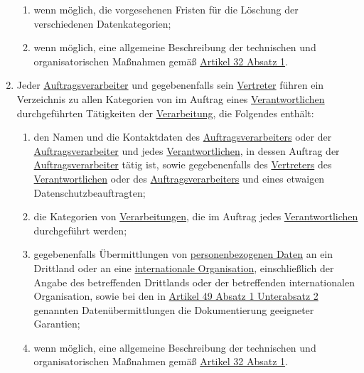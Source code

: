\begin{enumerate}
\begin{enumerate}
    \item wenn möglich, die vorgesehenen Fristen für die Löschung der verschiedenen Datenkategorien;
    \label{itm:30-1f}

    \item wenn möglich, eine allgemeine Beschreibung der technischen und organisatorischen Maßnahmen gemäß
     \hyperref[itm:32-1]{Artikel 32 Absatz 1}.
    \label{itm:30-1g}

  \end{enumerate}

  \item Jeder \hyperref[itm:04-8]{Auftragsverarbeiter} und gegebenenfalls sein \hyperref[itm:04-17]{Vertreter} führen
   ein Verzeichnis zu allen Kategorien von im Auftrag eines \hyperref[itm:04-7]{Verantwortlichen} durchgeführten
   Tätigkeiten der \hyperref[itm:04-2]{Verarbeitung}, die Folgendes enthält:
  \label{itm:30-2}

  \begin{enumerate}
  
    \item den Namen und die Kontaktdaten des \hyperref[itm:04-8]{Auftragsverarbeiters} oder der \hyperref[itm:04-8]
     {Auftragsverarbeiter} und jedes
     \hyperref[itm:04-7]{Verantwortlichen}, in dessen Auftrag der \hyperref[itm:04-8]{Auftragsverarbeiter} tätig ist,
      sowie gegebenenfalls des \hyperref[itm:04-17]{Vertreters} des
     \hyperref[itm:04-7]{Verantwortlichen} oder des \hyperref[itm:04-8]{Auftragsverarbeiters} und eines etwaigen
      Datenschutzbeauftragten;
    \label{itm:30-2a}

    \item die Kategorien von \hyperref[itm:04-2]{Verarbeitungen}, die im Auftrag jedes \hyperref[itm:04-7]
     {Verantwortlichen} durchgeführt werden;
    \label{itm:30-2b}

    \item gegebenenfalls Übermittlungen von \hyperref[itm:04-1]{personenbezogenen Daten} an ein Drittland oder an
     eine \hyperref[itm:04-29]{internationale Organisation}, einschließlich der Angabe des betreffenden Drittlands oder
     der betreffenden internationalen Organisation, sowie bei den in \hyperref[itm:49-1-2]{Artikel 49 Absatz 1
     Unterabsatz 2} genannten Datenübermittlungen die Dokumentierung geeigneter Garantien;
    \label{itm:30-2c}

    \item wenn möglich, eine allgemeine Beschreibung der technischen und organisatorischen Maßnahmen gemäß \hyperref
     [itm:32-1]{Artikel 32 Absatz 1}.
    \label{itm:30-2d}


\end{enumerate}
\end{enumerate}
